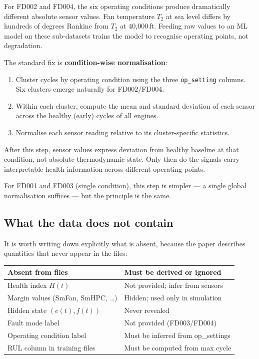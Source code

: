 \documentclass[11pt, a4paper]{article}
\begin{document}
For FD002 and FD004, the six operating conditions produce
dramatically different absolute sensor values. Fan temperature
$T_2$ at sea level differs by hundreds of degrees Rankine from
$T_2$ at 40,000\,ft. Feeding raw values to an ML model on these
sub-datasets trains the model to recognise operating points,
not degradation.

The standard fix is \textbf{condition-wise normalisation}:

\begin{enumerate}[noitemsep]
  \item Cluster cycles by operating condition using the three
        \texttt{op\_setting} columns. Six clusters emerge
        naturally for FD002/FD004.
  \item Within each cluster, compute the mean and standard
        deviation of each sensor across the healthy (early)
        cycles of all engines.
  \item Normalise each sensor reading relative to its
        cluster-specific statistics.
\end{enumerate}

After this step, sensor values express deviation from healthy
baseline at that condition, not absolute thermodynamic state.
Only then do the signals carry interpretable health information
across different operating points.

For FD001 and FD003 (single condition), this step is simpler ---
a single global normalisation suffices --- but the principle
is the same.

\subsection{What the data does not contain}

It is worth writing down explicitly what is absent, because
the paper describes quantities that never appear in the files:

\begin{center}
\begin{tabular}{@{}ll@{}}
  \toprule
  Absent from files & Must be derived or ignored \\
  \midrule
  Health index $H(t)$              & Not provided; infer from sensors \\
  Margin values (SmFan, SmHPC, \ldots) & Hidden; used only in simulation \\
  Hidden state $(e(t), f(t))$      & Never revealed \\
  Fault mode label                 & Not provided (FD003/FD004) \\
  Operating condition label        & Must be inferred from op\_settings \\
  RUL column in training files     & Must be computed from max cycle \\
  \bottomrule
\end{tabular}
\end{center}
\end{document}
